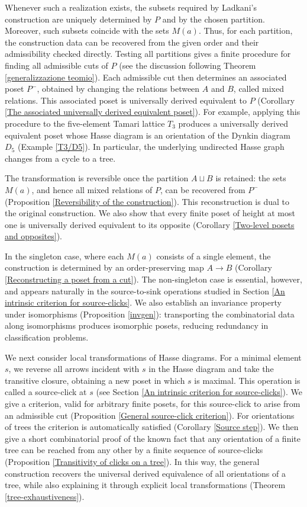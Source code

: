 Whenever such a realization exists, the subsets required by Ladkani's construction are uniquely determined by $P$ and by the chosen partition. Moreover, such subsets coincide with the sets $M(a)$. Thus, for each partition, the construction data can be recovered from the given order and their admissibility checked directly. Testing all partitions gives a finite procedure for finding all admissible cuts of $P$ (see the discussion following Theorem \ref{generalizzazione teomio}). Each admissible cut then determines an associated poset $P^-$, obtained by changing the relations between $A$ and $B$, called mixed relations. This associated poset is universally derived equivalent to $P$ (Corollary \ref{The associated universally derived equivalent poset}). For example, applying this procedure to the five-element Tamari lattice $T_3$ produces a universally derived equivalent poset whose Hasse diagram is an orientation of the Dynkin diagram $D_5$ (Example \ref{T3/D5}). In particular, the underlying undirected Hasse graph changes from a cycle to a tree.

The transformation is reversible once the partition $A \sqcup B$ is retained: the sets $M(a)$, and hence all mixed relations of $P$, can be recovered from $P^-$ (Proposition \ref{Reversibility of the construction}). This reconstruction is dual to the original construction. We also show that every finite poset of height at most one is universally derived equivalent to its opposite (Corollary \ref{Two-level posets and opposites}).

In the singleton case, where each $M(a)$ consists of a single element, the construction is determined by an order-preserving map $A \to B$ (Corollary \ref{Reconstructing a poset from a cut}). The non-singleton case is essential, however, and appears naturally in the source-to-sink operations studied in Section \ref{An intrinsic criterion for source-clicks}. We also establish an invariance property under isomorphisms (Proposition \ref{invgen}): transporting the combinatorial data along isomorphisms produces isomorphic posets, reducing redundancy in classification problems.

We next consider local transformations of Hasse diagrams. For a minimal element $s$, we reverse all arrows incident with $s$ in the Hasse diagram and take the transitive closure, obtaining a new poset in which $s$ is maximal. This operation is called a source-click at $s$ (see Section \ref{An intrinsic criterion for source-clicks}). We give a criterion, valid for arbitrary finite posets, for this source-click to arise from an admissible cut (Proposition \ref{General source-click criterion}). For orientations of trees the criterion is automatically satisfied (Corollary \ref{Source step}). We then give a short combinatorial proof of the known fact that any orientation of a finite tree can be reached from any other by a finite sequence of source-clicks (Proposition \ref{Transitivity of clicks on a tree}). In this way, the general construction recovers the universal derived equivalence of all orientations of a tree, while also explaining it through explicit local transformations (Theorem \ref{tree-exhaustiveness}).

